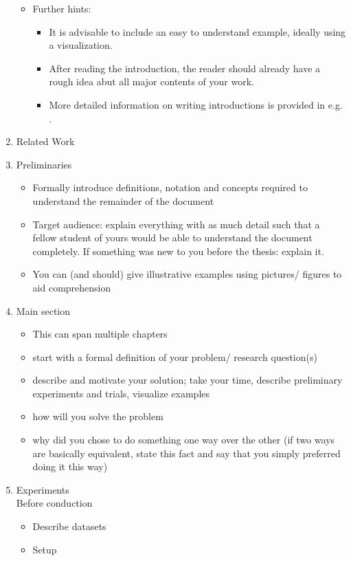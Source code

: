 \documentclass[twocolumn]{mlai-guide}
\begin{document}
\begin{enumerate}
\begin{itemize}
			\item Further hints:
			\begin{itemize}
				\item It is advisable to include an easy to understand example, ideally using a visualization. 
				\item After reading the introduction, the reader should already have a rough idea abut all major contents of your work.
				\item More detailed information on writing introductions is provided in e.g. \cite{zobel_writing}.
			\end{itemize}
		\end{itemize}
	\item Related Work
	\item Preliminaries
		\begin{itemize}
			\item Formally introduce definitions, notation and concepts required to understand the remainder of the document
			\item Target audience: explain everything with as much detail such that a fellow student of yours would be able to understand the document completely. If something was new to you before the thesis: explain it.
			\item You can (and should) give illustrative examples using pictures/ figures to aid comprehension
		\end{itemize}
	\item Main section
		\begin{itemize}
			\item This can span multiple chapters
			\item start with a formal definition of your problem/ research question(s)
			\item describe and motivate your solution; take your time, describe preliminary experiments and trials, visualize examples
			\item how will you solve the problem
			\item why did you chose to do something one way over the other (if two ways are basically equivalent, state this fact and say that you simply preferred doing it this way)
		\end{itemize}
	\item Experiments\\
		Before conduction
		\begin{itemize}
			\item Describe datasets
			\item Setup

\end{itemize}
\end{enumerate}
\end{document}
